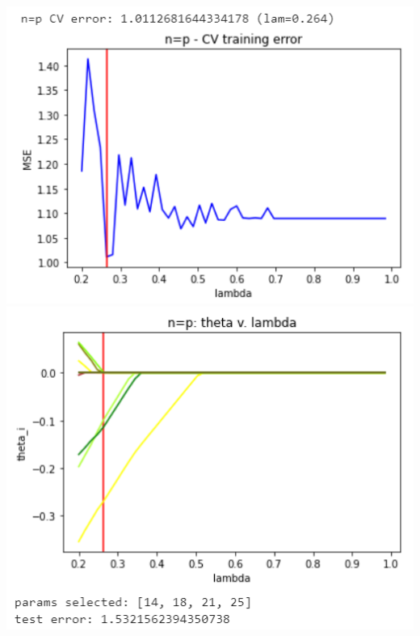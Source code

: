 \documentclass[11pt]{article}
\begin{document}
\begin{center}
\includegraphics[scale=0.7]{charts/lasso_corr_n_eq_p_err.PNG}
\includegraphics[scale=0.7]{charts/lasso_corr_n_eq_p_thetas.PNG}


\end{center}
\end{document}
